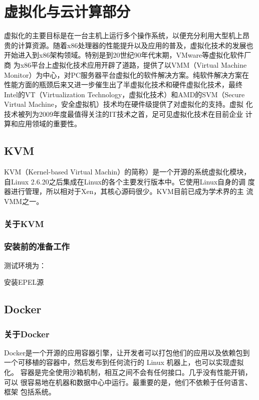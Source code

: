 \part{虚拟化与云计算部分}
\label{part:virtualization}

虚拟化的主要目标是在一台主机上运行多个操作系统，以便充分利用大型机上昂
贵的计算资源。随着x86处理器的性能提升以及应用的普及，虚拟化技术的发展也
开始进入到x86架构领域。特别是到20世纪90年代末期，VMware等虚拟化软件厂商
为x86平台上虚拟化技术应用开辟了道路，提供了以VMM（Virtual Machine
  Monitor）为中心，对PC服务器平台虚拟化的软件解决方案。纯软件解决方案在
性能方面的瓶颈后来又进一步催生出了半虚拟化技术和硬件虚拟化技术，最终
Intel的VT（Virtualization Technology，虚拟化技术）和AMD的SVM（Secure
  Virtual Machine，安全虚拟机）技术均在硬件级提供了对虚拟化的支持。虚拟
化技术被列为2009年度最值得关注的IT技术之首，足可见虚拟化技术在目前企业
计算和应用领域的重要性。

\chapter{KVM}
\label{chap:kvm}

KVM（Kernel-based Virtual Machin）的简称）是一个开源的系统虚拟化模块，
自Linux 2.6.20之后集成在Linux的各个主要发行版本中。它使用Linux自身的调
度器进行管理，所以相对于Xen，其核心源码很少。KVM目前已成为学术界的主
流VMM之一。

\section{关于KVM}
\label{sec:AboutKVM}

\section{安装前的准备工作}
\label{sec:kvmPrepare}

测试环境为：

安装EPEL源

\chapter{Docker}

\section{关于Docker}

Docker是一个开源的应用容器引擎，让开发者可以打包他们的应用以及依赖包到
一个可移植的容器中，然后发布到任何流行的 Linux 机器上，也可以实现虚拟化。
容器是完全使用沙箱机制，相互之间不会有任何接口。几乎没有性能开销，可以
很容易地在机器和数据中心中运行。最重要的是，他们不依赖于任何语言、框架
包括系统。

